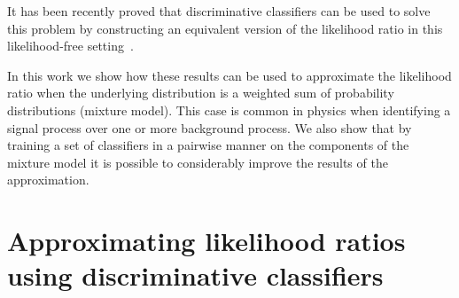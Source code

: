 \documentclass[a4paper]{jpconf}
\begin{document}
It has been recently proved that discriminative classifiers can be used to solve this problem by constructing an equivalent version of the likelihood ratio in this likelihood-free setting~\cite{Cranmer2015}.

In this work we show how these results can be used to approximate the likelihood ratio when the underlying distribution is a weighted sum of probability distributions (mixture model). This case is common in physics when identifying a signal process over one or more background process. We also show 
that by training a set of classifiers in a pairwise manner on the components of the mixture model it is possible to considerably improve the results of the approximation. %


\section{Approximating likelihood ratios using discriminative classifiers}\label{S:ALR}
\end{document}
